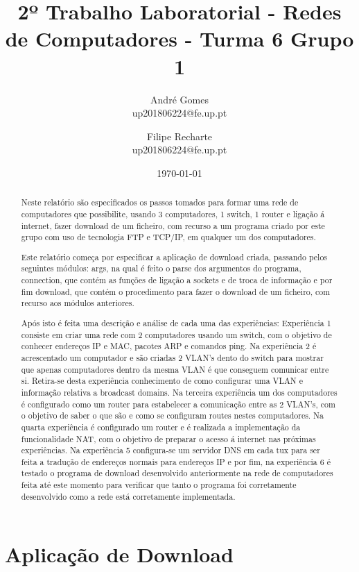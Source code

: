 \documentclass[11pt, a4paper]{article}
\title{2º Trabalho Laboratorial - Redes de Computadores - Turma 6 Grupo 1}
\author{André Gomes\\up201806224@fe.up.pt \and Filipe Recharte\\up201806224@fe.up.pt}
\date{\today}
\begin{document}
\maketitle

\begin{abstract}
Neste relatório são especificados os passos tomados para formar uma rede de computadores que possibilite, usando 3 computadores, 1 switch, 1 router e ligação á internet, fazer download de um ficheiro, com recurso a um programa criado por este grupo com uso de tecnologia FTP e TCP/IP, em qualquer um dos computadores. 

Este relatório começa por especificar a aplicação de download criada, passando pelos seguintes módulos: args, na qual é feito o parse dos argumentos do programa, connection, que contém as funções de ligação a sockets e de troca de informação e por fim download, que contém o procedimento para fazer o download de um ficheiro, com recurso aos módulos anteriores.

Após isto é feita uma descrição e análise de cada uma das experiências: Experiência 1 consiste em criar uma rede com 2 computadores usando um switch, com o objetivo de conhecer endereços IP e MAC, pacotes ARP e comandos ping. Na experiência 2 é acrescentado um computador e são criadas 2 VLAN's dento do switch para mostrar que apenas computadores dentro da mesma VLAN é que conseguem comunicar entre si. Retira-se desta experiência conhecimento de como configurar uma VLAN e informação relativa a broadcast domains. Na terceira experiência um dos computadores é configurado como um router para estabelecer a comunicação entre as 2 VLAN's, com o objetivo de saber o que são e como se configuram routes nestes computadores. Na quarta experiência é configurado um router e é realizada a implementação da funcionalidade NAT, com o objetivo de preparar o acesso á internet nas próximas experiências. Na experiência 5 configura-se um servidor DNS em cada tux para ser feita a tradução de endereços normais para endereços IP e por fim, na experiência 6 é testado o programa de download desenvolvido anteriormente na rede de computadores feita até este momento para verificar que tanto o programa foi corretamente desenvolvido como a rede está corretamente implementada.
\end{abstract}

\tableofcontents



\section{Aplicação de Download}

\end{document}
